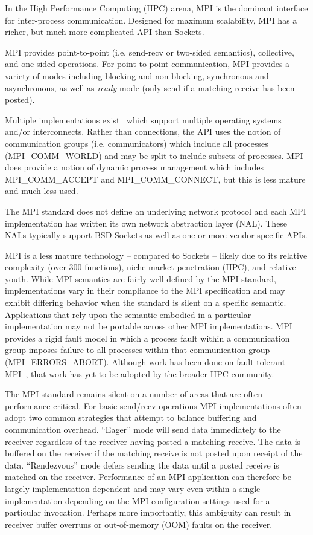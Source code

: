 In the High Performance Computing (HPC) arena, MPI is the dominant
interface for inter-process communication. Designed for maximum scalability, MPI has a
richer, but much more complicated API than Sockets.

MPI provides point-to-point (i.e. send-recv or two-sided semantics), collective, and
one-sided operations. For point-to-point communication, MPI provides a variety of modes
including blocking and non-blocking, synchronous and asynchronous, as well as \emph{ready}
mode (only send if a matching receive has been posted).

Multiple implementations exist~\cite{ompi_04_pvmmpi_overview, Gropp:1996:HPI, Liu:2003:RDMA}
which support multiple operating systems and/or interconnects.  Rather than connections,
the API uses the notion of communication groups (i.e.  communicators) which include all
processes ({\sf MPI\_COMM\_WORLD}) and may be split to include subsets of processes. MPI does
provide a notion of dynamic process management which includes {\sf MPI\_COMM\_ACCEPT} and
{\sf MPI\_COMM\_CONNECT}, but this is less mature and much less used.

The MPI standard does not define an underlying network protocol and each MPI
implementation has written its own network abstraction layer (NAL). These NALs typically
support BSD Sockets as well as one or more vendor specific APIs.

MPI is a less mature technology -- compared to Sockets -- likely due to its
relative complexity (over 300 functions), niche market penetration
(HPC), and relative youth. While MPI semantics are fairly well defined
by the MPI standard, implementations vary in their compliance to the
MPI specification and may exhibit differing behavior when the standard is
silent on a specific semantic. Applications that rely upon the
semantic embodied in a particular implementation may not be portable
across other MPI implementations. MPI provides a rigid fault model in
which a process fault within a communication group imposes failure to
all processes within that communication group
({\sf MPI\_ERRORS\_ABORT}). Although work has been done on fault-tolerant
MPI~\cite{fagg04:_fault_toler_commun_librar_applic_high_perof, mpi-ft},
that work has yet to be adopted by the broader HPC community. 

The MPI standard remains silent on a number of areas that are often
performance critical. For basic send/recv operations MPI
implementations often adopt two common strategies that attempt to
balance buffering and communication overhead. ``Eager'' mode will send
data immediately to the receiver regardless of the receiver having
posted a matching receive. The data is buffered on the receiver if the
matching receive is not posted upon receipt of the
data. ``Rendezvous'' mode defers sending the data until a posted
receive is matched on the receiver. Performance of an MPI application
can therefore be largely implementation-dependent and may vary even
within a single implementation depending on the MPI configuration
settings used for a particular invocation. Perhaps more importantly,
this ambiguity can result in receiver buffer overruns or out-of-memory
(OOM) faults on the receiver.

